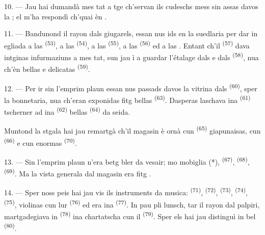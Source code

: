 10. --- Jau hai dumandà mes tat a tge ch'servan ils cudeschs mess sin assas davos la
; el m'ha respondì ch'quai èn .

\VUsaut{3.6mm}
\VUsaut{2.8mm}

11. --- Bandunond il rayon dals giugarels, essan nus ids en la suedlaria per dar in
egliada a las  \textsuperscript{(53)}, a las 
\textsuperscript{(54)}, a las  \textsuperscript{(55)}, a las 
\textsuperscript{(56)} ed a las . Entant ch'il 
\textsuperscript{(57)} dava intginas infurmaziuns a mes tat, sun jau ì a guardar
l'étalage dals  e dals  \textsuperscript{(58)}, nua
ch'èn bellas  e delicatas 
\textsuperscript{(59)}.

12. --- Per ir sin l'emprim plaun essan nus passads davos la vitrina dals
 \textsuperscript{(60)}, sper la bonnetaria, nua ch'eran exponidas fitg
bellas  \textsuperscript{(63)}. Dasperas laschava ina 
\textsuperscript{(61)} tscherner ad ina  \textsuperscript{(62)} bellas
 \textsuperscript{(64)} da seida.

Muntond la stgala hai jau remartgà ch'il magasin è ornà cun 
\textsuperscript{(65)} giapunaisas, cun  \textsuperscript{(66)} e cun enormas
 \textsuperscript{(70)}.

13. --- Sin l'emprim plaun n'era betg bler da vesair; mo mobiglia (*),  \textsuperscript{(67)},  \textsuperscript{(68)},  \textsuperscript{(69)}. Ma la vista generala dal magasin era fitg
.

14. --- Sper noss peis hai jau vis ils instruments da musica: 
\textsuperscript{(71)},  \textsuperscript{(72)}, 
\textsuperscript{(73)},  \textsuperscript{(74)}, 
\textsuperscript{(75)}, violinas cun lur  \textsuperscript{(76)} ed era ina
 \textsuperscript{(77)}. In pau pli lunsch, tar il rayon dal palpiri,
martgadegiava in  \textsuperscript{(78)} ina chartatscha cun il
 \textsuperscript{(79)}. Sper els hai jau distinguì in bel
 \textsuperscript{(80)}.

